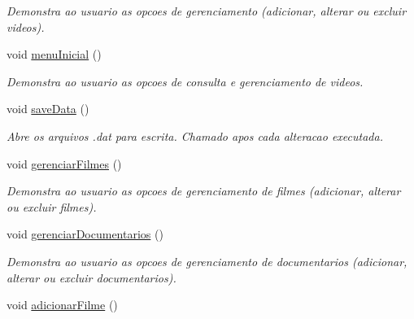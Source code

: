 \begin{DoxyCompactItemize}
\begin{DoxyCompactList}\small\item\em Demonstra ao usuario as opcoes de gerenciamento (adicionar, alterar ou excluir videos). \end{DoxyCompactList}\item 
void \hyperlink{classController_ab80bd964e9410be07f07ef3709681639}{menu\+Inicial} ()\hypertarget{classController_ab80bd964e9410be07f07ef3709681639}{}\label{classController_ab80bd964e9410be07f07ef3709681639}

\begin{DoxyCompactList}\small\item\em Demonstra ao usuario as opcoes de consulta e gerenciamento de videos. \end{DoxyCompactList}\item 
void \hyperlink{classController_aef69b3ce9427d64a8ae1c4c84289c2c7}{save\+Data} ()\hypertarget{classController_aef69b3ce9427d64a8ae1c4c84289c2c7}{}\label{classController_aef69b3ce9427d64a8ae1c4c84289c2c7}

\begin{DoxyCompactList}\small\item\em Abre os arquivos .dat para escrita. Chamado apos cada alteracao executada. \end{DoxyCompactList}\item 
void \hyperlink{classController_a724ebc287ae34ebd68164673ad2787dd}{gerenciar\+Filmes} ()\hypertarget{classController_a724ebc287ae34ebd68164673ad2787dd}{}\label{classController_a724ebc287ae34ebd68164673ad2787dd}

\begin{DoxyCompactList}\small\item\em Demonstra ao usuario as opcoes de gerenciamento de filmes (adicionar, alterar ou excluir filmes). \end{DoxyCompactList}\item 
void \hyperlink{classController_a4a2deed21d64ed714daefefeb77ba945}{gerenciar\+Documentarios} ()\hypertarget{classController_a4a2deed21d64ed714daefefeb77ba945}{}\label{classController_a4a2deed21d64ed714daefefeb77ba945}

\begin{DoxyCompactList}\small\item\em Demonstra ao usuario as opcoes de gerenciamento de documentarios (adicionar, alterar ou excluir documentarios). \end{DoxyCompactList}\item 
void \hyperlink{classController_a84fb77c50f103ab5c46f6666c7aff7a0}{adicionar\+Filme} ()\hypertarget{classController_a84fb77c50f103ab5c46f6666c7aff7a0}{}\label{classController_a84fb77c50f103ab5c46f6666c7aff7a0}


\end{DoxyCompactItemize}
